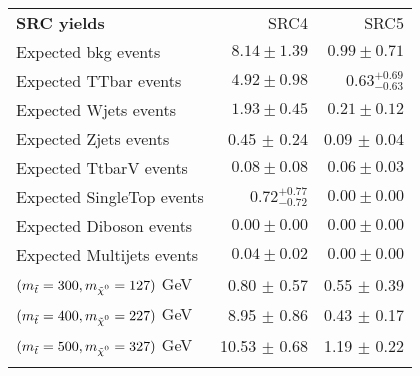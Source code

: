 \begin{table}[!h]
\begin{center}
{\begin{tabular*}{\textwidth}{@{\extracolsep{\fill}}lrrr}
\end{tabular*}
\begin{tabular*}{\textwidth}{@{\extracolsep{\fill}}lrr}
\noalign{\smallskip}\hline\noalign{\smallskip}
{\bf SRC yields}           & SRC4            & SRC5              \\[-0.05cm]
\noalign{\smallskip}\hline\noalign{\smallskip}
Expected bkg events         & $8.14 \pm 1.39$          & $0.99 \pm 0.71$              \\
\noalign{\smallskip}\hline\noalign{\smallskip}
        Expected TTbar events         & $4.92 \pm 0.98$          & $0.63_{-0.63}^{+0.69}$              \\
        Expected Wjets events         & $1.93 \pm 0.45$          & $0.21 \pm 0.12$              \\
        Expected Zjets events         & 0.45 $\pm$ 0.24          & 0.09 $\pm$ 0.04             \\
        Expected TtbarV events         & $0.08 \pm 0.08$          & $0.06 \pm 0.03$              \\
        Expected SingleTop events         & $0.72_{-0.72}^{+0.77}$          & $0.00 \pm 0.00$              \\
        Expected Diboson events         & $0.00 \pm 0.00$          & $0.00 \pm 0.00$              \\
        Expected Multijets events         & $0.04 \pm 0.02$          & $0.00 \pm 0.00$              \\
 \noalign{\smallskip}\hline\noalign{\smallskip}
$(\mstop = 300, \mLSP = 127)$ GeV & 0.80 $\pm$ 0.57 &  0.55 $\pm$ 0.39 \\
$(\mstop = 400, \mLSP = 227)$ GeV & 8.95 $\pm$ 0.86 & 0.43 $\pm$ 0.17 \\
$(\mstop = 500, \mLSP = 327)$ GeV & 10.53 $\pm$ 0.68  & 1.19 $\pm$ 0.22 \\
 \noalign{\smallskip}\hline\noalign{\smallskip}
\end{tabular*}

}
\end{center}
\end{table}
%
